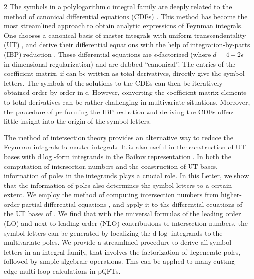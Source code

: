 \documentclass[fleqn]{2023SCGE}
\newcommand{\nd}{\mathrm{d}}
\newcommand{\ep}{\epsilon}
\begin{document}
\begin{multicols}{2}
The symbols in a polylogarithmic integral family are deeply related to the method of canonical differential equations (CDEs) \cite{Kotikov:1990kg, Kotikov:1991pm, Gehrmann:1999as, Bern:1993kr, Henn:2013pwa}.  This method has become the most streamlined approach to obtain analytic expressions of Feynman integrals. {  One chooses a canonical basis of master integrals with uniform transcendentality (UT) \cite{Henn:2013pwa}, and derive their differential equations with the help of integration-by-parts (IBP) reduction \cite{Chetyrkin:1981qh}. These differential equations are $\epsilon$-factorized (where $d=4-2\epsilon$ in dimensional regularization) and are dubbed ``canonical''.} The entries of the coefficient matrix, if can be written as total derivatives, directly give the symbol letters. The symbols of the solutions to the CDEs can then be iteratively obtained order-by-order in $\ep$. However, converting the coefficient matrix elements to total derivatives can be rather challenging in multivariate situations. Moreover, the procedure of performing the IBP reduction and deriving the CDEs offers little insight into the origin of the symbol letters.

The method of intersection theory \cite{Mastrolia:2018uzb, Frellesvig:2019uqt, Mizera:2019ose, Chestnov:2022xsy} provides an alternative way to reduce the Feynman integrals to master integrals. It is also useful in the construction of UT bases with $\nd\log$-form integrands \cite{Arkani-Hamed:2012zlh,Henn:2013pwa, Chen:2020uyk, Chen:2022lzr, Chicherin:2018old, Bern:2014kca, Henn:2020lye, Dlapa:2021qsl} in the Baikov representation \cite{Baikov:1996iu}. In both the computation of intersection numbers and the construction of UT bases, information of poles in the integrands plays a crucial role. In this Letter, we show that the information of poles also determines the symbol letters to a certain extent. We employ the method of computing intersection numbers from higher-order partial differential equations \cite{Chestnov:2022xsy}, and apply it to the differential equations of the UT bases of \cite{Chen:2020uyk, Chen:2022lzr}. We find that with the universal formulas of the leading order (LO) and next-to-leading order (NLO) contributions to intersection numbers, the symbol letters can be generated by localizing the $\nd\log$-integrands to the multivariate poles. We provide a streamlined procedure to derive all symbol letters in an integral family, that involves the factorization of degenerate poles, followed by simple algebraic operations. {  This can be applied to many cutting-edge multi-loop calculations in pQFTs.}



\end{multicols}
\end{document}
